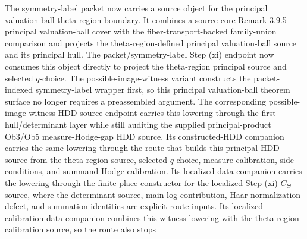 \begin{definition}
  \leanok
  The symmetry-label packet now carries a source object for the principal
  valuation-ball theta-region boundary.  It combines a source-core Remark 3.9.5
  principal valuation-ball cover with the fiber-transport-backed family-union
  comparison and projects the theta-region-defined principal valuation-ball
  source and its principal hull.  The packet/symmetry-label Step (xi) endpoint
  now consumes this object directly to project the theta-region principal
  source and selected \(q\)-choice.  The possible-image-witness variant
  constructs the packet-indexed symmetry-label wrapper first, so this
  principal valuation-ball theorem surface no longer requires a preassembled
  argument.  The corresponding possible-image-witness HDD-source endpoint
  carries this lowering through the first hull/determinant layer while still
  auditing the supplied principal-product Ob3/Ob5 measure-Hodge-gap HDD
  source.  Its constructed-HDD companion carries the same lowering through the
  route that builds this principal HDD source from the theta-region source,
  selected \(q\)-choice, measure calibration, side conditions, and
  summand-Hodge calibration.  Its localized-data companion carries the lowering
  through the finite-place constructor for the localized Step (xi)
  \(C_\Theta\) source, where the determinant source, main-log contribution,
  Haar-normalization defect, and summation identities are explicit route
  inputs.  Its localized calibration-data companion combines this witness
  lowering with the theta-region calibration source, so the route also stops

\end{definition}
